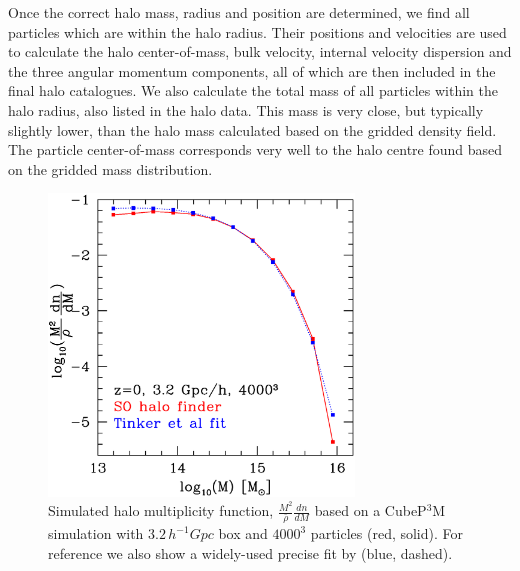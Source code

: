 Once the correct halo mass, radius and position are determined, we find all 
particles which are within the halo radius. Their positions and velocities are
used to calculate the halo center-of-mass, bulk velocity, internal velocity 
dispersion and the three angular momentum components, all of which are then 
included in the final halo catalogues. We also calculate the total mass of
all particles within the halo radius, also listed in the halo data. This mass
is very close, but  typically slightly lower, than the halo mass calculated 
based on the gridded density field. The particle center-of-mass corresponds 
very well to the halo centre found based on the gridded mass distribution. 


\begin{figure}%
  \begin{center}
    \includegraphics[width=3.2in]{graphs/mf_z0_Tinker.eps}
  \end{center}
  \caption{Simulated halo multiplicity function, 
    $\frac{M^2}{\bar{\rho}}\frac{dn}{dM}$ based on a
    CubeP$^3$M simulation with $3.2\,h^{-1}Gpc$ box and $4000^3$ 
    particles (red, solid). For reference we also show a widely-used 
    precise fit by \citet{2008ApJ...688..709T} (blue, dashed). 
    \label{mf}}
\end{figure}

